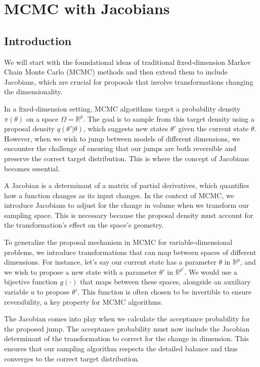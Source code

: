 \documentclass[10pt]{article}
\begin{document}
\section*{MCMC with Jacobians}

\subsection*{Introduction}
We will start with the foundational ideas of traditional fixed-dimension Markov Chain Monte Carlo (MCMC) methods and then extend them to include Jacobians, which are crucial for proposals that involve transformations changing the dimensionality.

In a fixed-dimension setting, MCMC algorithms target a probability density \(\pi(\theta)\) on a space \(\Omega = \mathbb{R}^p\). The goal is to sample from this target density using a proposal density \(q(\theta'|\theta)\), which suggests new states \(\theta'\) given the current state \(\theta\). However, when we wish to jump between models of different dimensions, we encounter the challenge of ensuring that our jumps are both reversible and preserve the correct target distribution. This is where the concept of Jacobians becomes essential.

A Jacobian is a determinant of a matrix of partial derivatives, which quantifies how a function changes as its input changes. In the context of MCMC, we introduce Jacobians to adjust for the change in volume when we transform our sampling space. This is necessary because the proposal density must account for the transformation's effect on the space's geometry.

To generalize the proposal mechanism in MCMC for variable-dimensional problems, we introduce transformations that can map between spaces of different dimensions. For instance, let's say our current state has a parameter \(\theta\) in \(\mathbb{R}^p\), and we wish to propose a new state with a parameter \(\theta'\) in \(\mathbb{R}^{p'}\). We would use a bijective function \(g(\cdot)\) that maps between these spaces, alongside an auxiliary variable \(u\) to propose \(\theta'\). This function is often chosen to be invertible to ensure reversibility, a key property for MCMC algorithms.

The Jacobian comes into play when we calculate the acceptance probability for the proposed jump. The acceptance probability must now include the Jacobian determinant of the transformation to correct for the change in dimension. This ensures that our sampling algorithm respects the detailed balance and thus converges to the correct target distribution.
\end{document}
